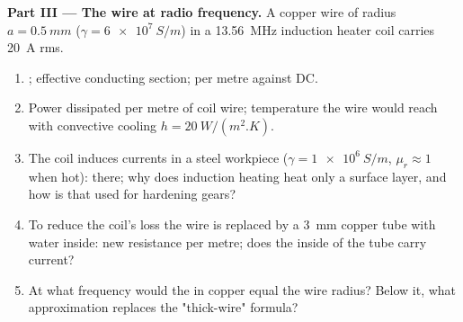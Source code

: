 \begin{problem}
\medskip
\noindent\textbf{Part III --- The wire at radio frequency.}
A copper wire of radius $a = \qty{0.5}{mm}$ ($\gamma = \qty{6e7}{S/m}$) in a
\qty{13.56}{MHz} induction heater coil carries \qty{20}{A} rms.
\begin{enumerate}[resume]
  \item {}; effective conducting section;  per
        metre against DC.
  \item Power dissipated per metre of coil wire; temperature the
        wire would reach with convective cooling $h = \qty{20}{W/(m^2.K)}$.
  \item The coil induces currents in a steel workpiece ($\gamma =
        \qty{1e6}{S/m}$, $\mu_r \approx 1$ when hot):  there; why does
        induction heating heat only a surface layer, and how is that
        used for hardening gears?
  \item To reduce the coil's loss the wire is replaced by a \qty{3}{mm}
        copper tube with water inside: new resistance per metre; does
        the inside of the tube carry current?
  \item At what frequency would the  in copper equal the
        wire radius? Below it, what approximation replaces the
        "thick-wire" formula?
\end{enumerate}


\end{problem}
